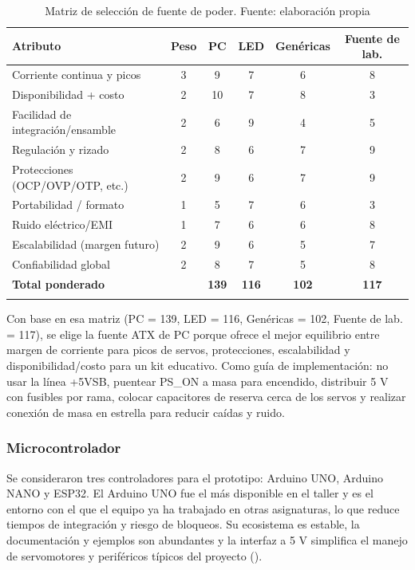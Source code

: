 \begin{table}[H]
\centering
\caption{Matriz de selección de fuente de poder. Fuente: elaboración propia}
\begin{tabular}{lccccc}
\toprule
\textbf{Atributo} & \textbf{Peso} & \textbf{PC} & \textbf{LED} & \textbf{Genéricas} & \textbf{Fuente de lab.} \\
\midrule
Corriente continua y picos         & 3 & 9 & 7 & 6 & 8 \\
Disponibilidad + costo             & 2 & 10 & 7 & 8 & 3 \\
Facilidad de integración/ensamble  & 2 & 6 & 9 & 4 & 5 \\
Regulación y rizado                & 2 & 8 & 6 & 7 & 9 \\
Protecciones (OCP/OVP/OTP, etc.)   & 2 & 9 & 6 & 7 & 9 \\
Portabilidad / formato             & 1 & 5 & 7 & 6 & 3 \\
Ruido eléctrico/EMI                & 1 & 7 & 6 & 6 & 8 \\
Escalabilidad (margen futuro)      & 2 & 9 & 6 & 5 & 7 \\
Confiabilidad global               & 2 & 8 & 7 & 5 & 8 \\
\midrule
\textbf{Total ponderado}           &   & \textbf{139} & \textbf{116} & \textbf{102} & \textbf{117} \\
\bottomrule
\label{tab:matriz_fuente}
\end{tabular}
\end{table}

Con base en esa matriz (PC = 139, LED = 116, Genéricas = 102, Fuente de lab. = 117), se elige la fuente ATX de PC porque ofrece el mejor equilibrio entre margen de corriente para picos de servos, protecciones, escalabilidad y disponibilidad/costo para un kit educativo. Como guía de implementación: no usar la línea +5VSB, puentear PS\_ON a masa para encendido, distribuir 5 V con fusibles por rama, colocar capacitores de reserva cerca de los servos y realizar conexión de masa en estrella para reducir caídas y ruido.


\subsubsection{Microcontrolador}

Se consideraron tres controladores para el prototipo: Arduino UNO, Arduino NANO y ESP32. El Arduino UNO fue el más disponible en el taller y es el entorno con el que el equipo ya ha trabajado en otras asignaturas, lo que reduce tiempos de integración y riesgo de bloqueos. Su ecosistema es estable, la documentación y ejemplos son abundantes y la interfaz a 5 V simplifica el manejo de servomotores y periféricos típicos del proyecto (\cite{arduino_uno_rev3_docs}). 

